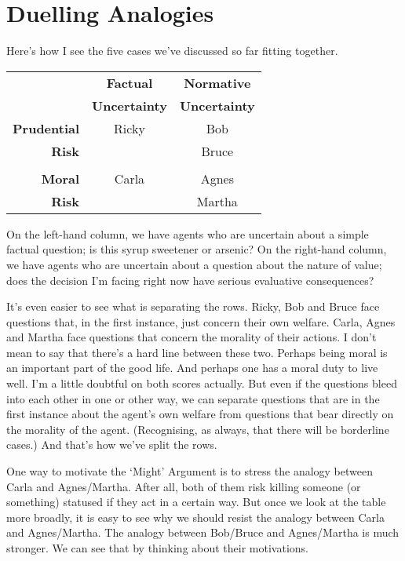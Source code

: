 \section{Duelling Analogies}
\label{duellinganalogies}

Here's how I see the five cases we've discussed so far fitting together.

\begin{table}[htbp]
\begin{minipage}{\linewidth}
\setlength{\tymax}{0.5\linewidth}
\centering
\small
\begin{tabulary}{\textwidth}{@{}RCC@{}} \toprule
&\textbf{Factual}&\textbf{Normative}\\
&\textbf{Uncertainty}&\textbf{Uncertainty}\\
\midrule
\textbf{Prudential}&Ricky&Bob\\
\textbf{Risk}&&Bruce\\
&&\\
\textbf{Moral}&Carla&Agnes\\
\textbf{Risk}&&Martha\\

\bottomrule

\end{tabulary}
\end{minipage}
\end{table}

On the left-hand column, we have agents who are uncertain about a simple factual question; is this syrup sweetener or arsenic? On the right-hand column, we have agents who are uncertain about a question about the nature of value; does the decision I'm facing right now have serious evaluative consequences?

It's even easier to see what is separating the rows. Ricky, Bob and Bruce face questions that, in the first instance, just concern their own welfare. Carla, Agnes and Martha face questions that concern the morality of their actions. I don't mean to say that there's a hard line between these two. Perhaps being moral is an important part of the good life. And perhaps one has a moral duty to live well. I'm a little doubtful on both scores actually. But even if the questions bleed into each other in one or other way, we can separate questions that are in the first instance about the agent's own welfare from questions that bear directly on the morality of the agent. (Recognising, as always, that there will be borderline cases.) And that's how we've split the rows.

One way to motivate the `Might' Argument is to stress the analogy between Carla and Agnes\slash Martha. After all, both of them risk killing someone (or something) statused if they act in a certain way. But once we look at the table more broadly, it is easy to see why we should resist the analogy between Carla and Agnes\slash Martha. The analogy between Bob\slash Bruce and Agnes\slash Martha is much stronger. We can see that by thinking about their motivations.

